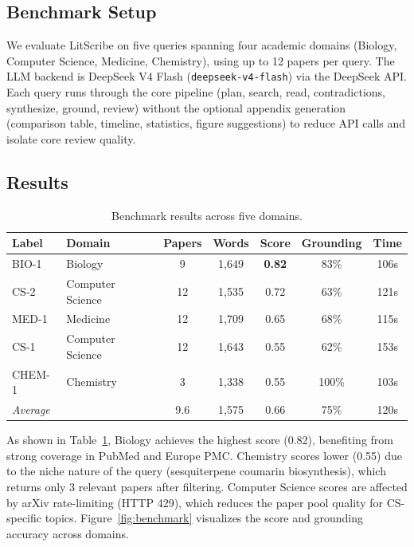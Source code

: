 \documentclass[11pt]{article}
\begin{document}
\subsection{Benchmark Setup}

We evaluate LitScribe on five queries spanning four academic domains (Biology, Computer Science, Medicine, Chemistry), using up to 12 papers per query. The LLM backend is DeepSeek V4 Flash (\texttt{deepseek-v4-flash}) via the DeepSeek API. Each query runs through the core pipeline (plan, search, read, contradictions, synthesize, ground, review) without the optional appendix generation (comparison table, timeline, statistics, figure suggestions) to reduce API calls and isolate core review quality.

\subsection{Results}

\begin{table}[h]
\centering
\caption{Benchmark results across five domains.}
\label{tab:benchmark}
\begin{tabular}{llccccc}
\toprule
Label & Domain & Papers & Words & Score & Grounding & Time \\
\midrule
BIO-1 & Biology & 9 & 1,649 & \textbf{0.82} & 83\% & 106s \\
CS-2 & Computer Science & 12 & 1,535 & 0.72 & 63\% & 121s \\
MED-1 & Medicine & 12 & 1,709 & 0.65 & 68\% & 115s \\
CS-1 & Computer Science & 12 & 1,643 & 0.55 & 62\% & 153s \\
CHEM-1 & Chemistry & 3 & 1,338 & 0.55 & 100\% & 103s \\
\midrule
\multicolumn{2}{l}{\textit{Average}} & 9.6 & 1,575 & 0.66 & 75\% & 120s \\
\bottomrule
\end{tabular}
\end{table}

As shown in Table~\ref{tab:benchmark}, Biology achieves the highest score (0.82), benefiting from strong coverage in PubMed and Europe PMC. Chemistry scores lower (0.55) due to the niche nature of the query (sesquiterpene coumarin biosynthesis), which returns only 3 relevant papers after filtering. Computer Science scores are affected by arXiv rate-limiting (HTTP 429), which reduces the paper pool quality for CS-specific topics. Figure~\ref{fig:benchmark} visualizes the score and grounding accuracy across domains.
\end{document}
